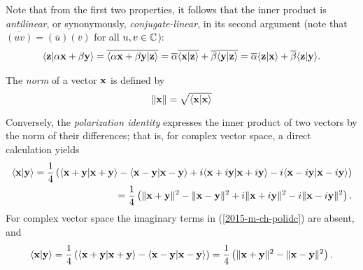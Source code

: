 Note that from the first two properties, it follows that the inner product is
{\em antilinear}, or synonymously,
{\em conjugate-linear}, in its second argument (note that $\overline{(uv)}=(\overline{u}) (\overline{v})$ for all $u,v\in {\Bbb C}$):
\begin{equation}
\begin{split}
 \langle  {\bf z} \vert \alpha {\bf x} + \beta {\bf y} \rangle
 =
 \overline{\langle \alpha {\bf x} + \beta {\bf y} \vert  {\bf z} \rangle }
 =
 \overline{ \alpha}\overline{\langle {\bf x} \vert  {\bf z}\rangle}
 + \overline{\beta }\overline{\langle {\bf y} \vert  {\bf z}\rangle}
 =
 \overline{\alpha} {\langle {\bf z}\vert {\bf x}\rangle}
 +\overline{\beta} {\langle {\bf z}\vert {\bf y}\rangle}
.
\end{split}
\end{equation}

The {\em norm} of a vector ${\bf x}$
is defined by
\begin{equation}
\|
{\bf x}
\|
=\sqrt{\langle {\bf x}\vert {\bf x}\rangle }
\end{equation}

Conversely, the {\em polarization identity}
expresses the inner product of two vectors by the norm of their differences; that is, for complex vector space,  a direct calculation yields
\begin{equation}
\begin{split}
\langle {\bf x}\vert {\bf y}\rangle
=
\frac{1}{4}\left(
\langle {\bf x}+ {\bf y} \vert {\bf x}+ {\bf y}\rangle
-
\langle {\bf x}- {\bf y} \vert {\bf x}- {\bf y}\rangle
+ i
\langle {\bf x}+ i{\bf y} \vert {\bf x}+ i{\bf y}\rangle
- i
\langle {\bf x}- i{\bf y} \vert {\bf x} -i {\bf y}\rangle
\right)
\\
=
\frac{1}{4}\left(
\|  {\bf x}+ {\bf y} \|^2
-
\|  {\bf x}- {\bf y} \|^2
+ i
\|  {\bf x}+ i{\bf y} \|^2
- i
\|  {\bf x}- i{\bf y} \|^2
\right).
\end{split}
\label{2015-m-ch-polidc}
\end{equation}
For complex vector space the imaginary terms in (\ref{2015-m-ch-polidc}) are absent, and
\begin{equation}
\langle {\bf x}\vert {\bf y}\rangle
=
\frac{1}{4}\left(
\langle {\bf x}+ {\bf y} \vert {\bf x}+ {\bf y}\rangle
-
\langle {\bf x}- {\bf y} \vert {\bf x}- {\bf y}\rangle
\right)
=
\frac{1}{4}\left(
\|  {\bf x}+ {\bf y} \|^2
-
\|  {\bf x}- {\bf y} \|^2
\right).
\label{2015-m-ch-polidr}
\end{equation}


